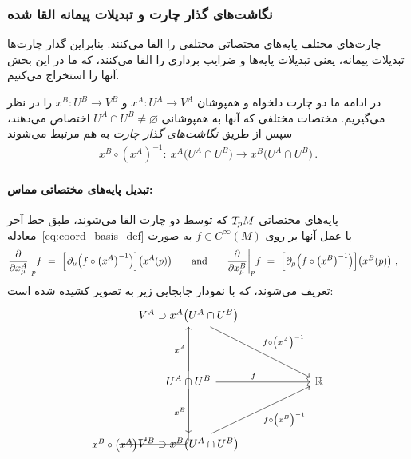 \subsubsection{نگاشت‌های گذار چارت و تبدیلات پیمانه القا شده}
\label{apx:chart_transition_induced_gauge_trafos}

چارت‌های مختلف پایه‌های مختصاتی مختلفی را القا می‌کنند.
بنابراین گذار چارت‌ها تبدیلات پیمانه، یعنی تبدیلات پایه‌ها و ضرایب برداری را القا می‌کنند، که ما در این بخش آنها را استخراج می‌کنیم.

در ادامه ما دو چارت دلخواه و همپوشان $x^A: U^A \to V^A$ و $x^B: U^B\to V^B$ را در نظر می‌گیریم.
مختصات مختلفی که آنها به همپوشانی $U^A \cap U^B \neq \varnothing$ اختصاص می‌دهند، سپس از طریق \emph{نگاشت‌های گذار چارت} به هم مرتبط می‌شوند
\begin{align}\label{eq:chart_transition_fct}
	x^B\circ\left(x^A\right)^{-1} \!:\ x^A\big(U^A\cap U^B\big)\to x^B\big(U^A\cap U^B\big) \,.
\end{align}



\paragraph{تبدیل پایه‌های مختصاتی مماس:}
پایه‌های مختصاتی $T_{\mkern-1.5mu p}\mkern-.5muM$ که توسط دو چارت القا می‌شوند، طبق خط آخر معادله~\eqref{eq:coord_basis_def} با عمل آنها بر روی $f \in C^\infty(M)$ به صورت
\begin{align}
	\frac{\partial}{\partial x^A_\mu} \bigg|_p f
	\ =\ \Big[\mkern1.5mu \partial_\mu \pig(f \circ \big(x^A\big)^{-1} \pig)\Big] \big(x^A(p)\big)
	\qquad \text{and} \qquad
	\frac{\partial}{\partial x^B_\mu} \bigg|_p f
	\ =\ \Big[\mkern1.5mu \partial_\mu \pig(f \circ \big(x^B\big)^{-1} \pig)\Big] \big(x^B(p)\big) \ ,
	\quad
\end{align}
تعریف می‌شوند، که با نمودار جابجایی زیر به تصویر کشیده شده است:
\begin{equation}\label{cd:scalar_field_chart_expressions}
	\begin{tikzcd}[row sep=4.em, column sep=6.em] %
		V^A \supset x^A \big( U^A \cap U^B \big)
		\arrow[rd, "{f\circ \big(x^A\big)^{-1}}"]
		\arrow[dd, rounded corners, to path={ 
			|- node[left, pos=.75]{\small$x^B \circ \big(x^A\big)^{-1}$} ([xshift=-3.5ex]\tikztotarget.west)
			-- (\tikztotarget.west)
		}]
		\\
		U^A \cap U^B
		\arrow[r, pos=.4, "f"]
		\arrow[u, "x^A"]
		\arrow[d, "x^B"']
		&
		\R
		\\
		V^B \supset x^B \big( U^A \cap U^B \big)
		\arrow[ru, "{f\circ \big(x^B\big)^{-1}}"']
	\end{tikzcd}
\end{equation}


